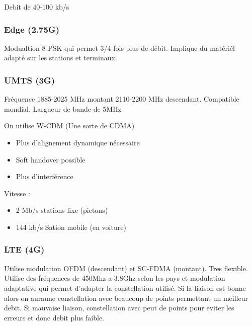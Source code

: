  			Debit de 40-100 kb/s
 			
 		\subsubsection{Edge (2.75G)}
 			Modualtion 8-PSK qui permet 3/4 fois plus de débit. Implique du matériél adapté sur les stations et terminaux.
 			
 		\subsubsection{UMTS (3G)}
 			Fréquence 1885-2025 MHz montant 2110-2200 MHz descendant. Compatible mondial. Largueur de bande de 5MHz
 			
 			On utilise W-CDM (Une sorte de CDMA)
 			\begin{itemize}
 				\item Plus d'alignement dynamique nécessaire
 				\item Soft handover possible
 				\item Plus d'interférence
 			\end{itemize}
 			
 			Vitesse :
 			\begin{itemize}
 				\item 2 Mb/s stations fixe (pietons)
 				\item 144 kb/s Sation mobile (en voiture)
 			\end{itemize}
 			
 		\subsubsection{LTE (4G)}
 			Utilise modulation OFDM (descendant) et SC-FDMA (montant). Tres flexible. Utilise des fréquences de 450Mhz a 3.8Ghz selon les pays et modulation adaptative qui permet d'adapter la constellation utilisé. Si la liaison est bonne alors on auraune constellation avec beaucoup de points permettant un meilleur debit. Si mauvaise liaison, constellation avec peut de points pour eviter les erreurs et donc debit plus faible.
 			
